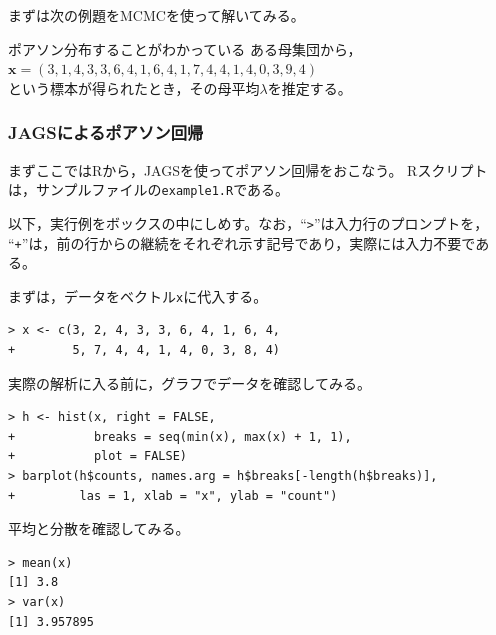 \documentclass[11pt,uplatex]{jsarticle}
\begin{document}
まずは次の例題をMCMCを使って解いてみる。

\vspace{1zw}

\hspace{18mm}
\begin{minipage}{100mm}
\begin{breakbox}
ポアソン分布することがわかっている ある母集団から，\\
\hspace{10mm} $\bm{x} = (3, 1, 4, 3, 3, 6, 4, 1, 6, 4, 
       1, 7, 4, 4, 1, 4, 0, 3, 9, 4)$\\
という標本が得られたとき，その母平均$\lambda$を推定する。
\end{breakbox}
\end{minipage}

\vspace{1zw}

\subsubsection{JAGSによるポアソン回帰}

まずここでは\textsf{R}から，\textsf{JAGS}を使ってポアソン回帰をおこなう。
\textsf{R}スクリプトは，サンプルファイルの\texttt{example1.R}である。

\vspace{1.5zw}
\begin{screen}
以下，実行例をボックスの中にしめす。なお，``\texttt{>}''は入力行のプロンプトを，
``\texttt{+}''は，前の行からの継続をそれぞれ示す記号であり，実際には入力不要である。
\end{screen}
\vspace{0.5zw}

まずは，データをベクトル\texttt{x}に代入する。
\begin{lstlisting}
> x <- c(3, 2, 4, 3, 3, 6, 4, 1, 6, 4,
+        5, 7, 4, 4, 1, 4, 0, 3, 8, 4)
\end{lstlisting}

実際の解析に入る前に，グラフでデータを確認してみる。
\begin{lstlisting}
> h <- hist(x, right = FALSE,
+           breaks = seq(min(x), max(x) + 1, 1),
+           plot = FALSE)
> barplot(h$counts, names.arg = h$breaks[-length(h$breaks)],
+         las = 1, xlab = "x", ylab = "count")
\end{lstlisting}

平均と分散を確認してみる。
\begin{lstlisting}
> mean(x)
[1] 3.8
> var(x)
[1] 3.957895
\end{lstlisting}
\end{document}
